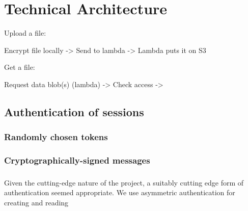 \section{Technical Architecture}

Upload a file:

Encrypt file locally ->
Send to lambda ->
Lambda puts it on S3

Get a file:

Request data blob(s) (lambda) ->
Check access ->


\subsection{Authentication of sessions}

\subsubsection{Randomly chosen tokens}

\subsubsection{Cryptographically-signed messages}

\subsubsection{}

Given the cutting-edge nature of the project, a suitably cutting edge form of authentication seemed appropriate. We use asymmetric authentication for creating and reading
